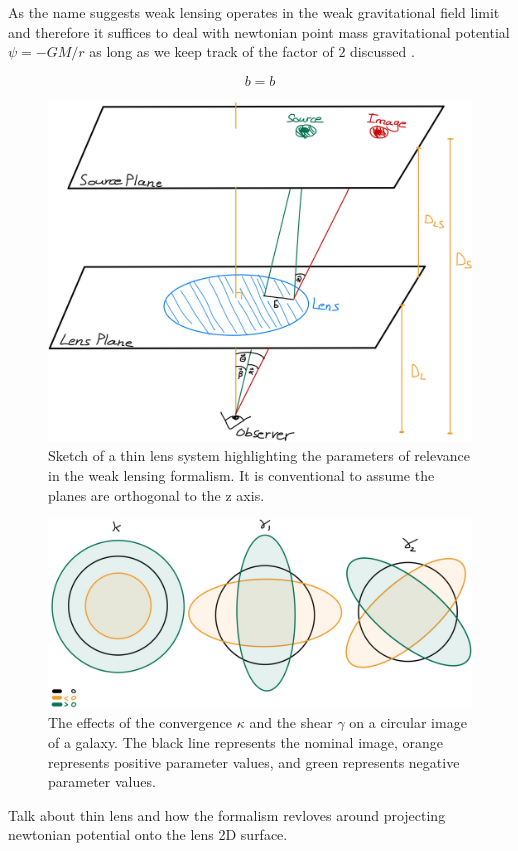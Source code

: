 \par As the name suggests weak lensing operates in the weak gravitational field limit and therefore it suffices to deal with newtonian point mass gravitational potential $\psi = -GM/r$ as long as we keep track of the factor of $2$ discussed . 

\begin{equation}
  b=b
  \label{eq:}
\end{equation}


\begin{figure}
    \begin{center}
      \includegraphics[width=\textwidth]{figs/lens.jpg}
    \end{center}
    \caption{Sketch of a thin lens system highlighting the parameters of relevance in the weak lensing formalism. It is conventional to assume the planes are orthogonal to the z axis.}
    \label{fig:lens}
\end{figure}

\begin{figure}
    \begin{center}
      \includegraphics[width=\textwidth]{figs/shear-11.jpg}
    \end{center}
    \caption{The effects of the convergence $\kappa$ and  the shear $\gamma$ on a circular image of a galaxy. The black line represents the nominal image, orange represents positive parameter values, and green represents negative parameter values.}
    \label{fig:shears}
\end{figure}


\par Talk about thin lens and how the formalism revloves around projecting newtonian potential onto the lens 2D surface.\cite{basicLens}
